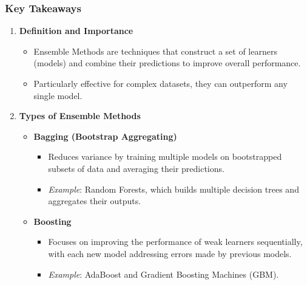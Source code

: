 \documentclass[aspectratio=169]{beamer}
\begin{document}
\begin{frame}[fragile]
    \frametitle{Key Takeaways}
    \begin{enumerate}
        \item \textbf{Definition and Importance}
        \begin{itemize}
            \item Ensemble Methods are techniques that construct a set of learners (models) and combine their predictions to improve overall performance.
            \item Particularly effective for complex datasets, they can outperform any single model.
        \end{itemize}
        
        \item \textbf{Types of Ensemble Methods}
        \begin{itemize}
            \item \textbf{Bagging (Bootstrap Aggregating)}
            \begin{itemize}
                \item Reduces variance by training multiple models on bootstrapped subsets of data and averaging their predictions.
                \item \textit{Example}: Random Forests, which builds multiple decision trees and aggregates their outputs.
            \end{itemize}
            
            \item \textbf{Boosting}
            \begin{itemize}
                \item Focuses on improving the performance of weak learners sequentially, with each new model addressing errors made by previous models.
                \item \textit{Example}: AdaBoost and Gradient Boosting Machines (GBM).
            \end{itemize}
        \end{itemize}
    \end{enumerate}
\end{frame}
\end{document}
